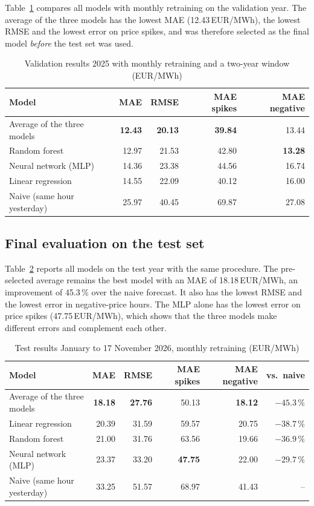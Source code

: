 \documentclass[12pt,oneside]{article}
\begin{document}
Table~\ref{tab:valroll} compares all models with monthly retraining on the validation year. The average of the three models has the lowest MAE (12.43\,EUR/MWh), the lowest RMSE and the lowest error on price spikes, and was therefore selected as the final model \emph{before} the test set was used.

\begin{table}[!htbp]
    \centering
    \caption{Validation results 2025 with monthly retraining and a two-year window (EUR/MWh)}
    \begin{tabular}{lrrrr}
        \toprule
        Model & MAE & RMSE & MAE spikes & MAE negative \\
        \midrule
        Average of the three models & \textbf{12.43} & \textbf{20.13} & \textbf{39.84} & 13.44 \\
        Random forest & 12.97 & 21.53 & 42.80 & \textbf{13.28} \\
        Neural network (MLP) & 14.36 & 23.38 & 44.56 & 16.74 \\
        Linear regression & 14.55 & 22.09 & 40.12 & 16.00 \\
        Naive (same hour yesterday) & 25.97 & 40.45 & 69.87 & 27.08 \\
        \bottomrule
    \end{tabular}
    \label{tab:valroll}
\end{table}

\subsection{Final evaluation on the test set}

Table~\ref{tab:test} reports all models on the test year with the same procedure. The pre-selected average remains the best model with an MAE of 18.18\,EUR/MWh, an improvement of 45.3\,\% over the naive forecast. It also has the lowest RMSE and the lowest error in negative-price hours. The MLP alone has the lowest error on price spikes (47.75\,EUR/MWh), which shows that the three models make different errors and complement each other.

\begin{table}[!htbp]
    \centering
    \caption{Test results January to 17 November 2026, monthly retraining (EUR/MWh)}
    \small
    \begin{tabular}{lrrrrr}
        \toprule
        Model & MAE & RMSE & MAE spikes & MAE negative & vs.\ naive \\
        \midrule
        Average of the three models & \textbf{18.18} & \textbf{27.76} & 50.13 & \textbf{18.12} & $-45.3\,\%$ \\
        Linear regression & 20.39 & 31.59 & 59.57 & 20.75 & $-38.7\,\%$ \\
        Random forest & 21.00 & 31.76 & 63.56 & 19.66 & $-36.9\,\%$ \\
        Neural network (MLP) & 23.37 & 33.20 & \textbf{47.75} & 22.00 & $-29.7\,\%$ \\
        Naive (same hour yesterday) & 33.25 & 51.57 & 68.97 & 41.43 & -- \\
        \bottomrule
    \end{tabular}
    \label{tab:test}
\end{table}
\end{document}
